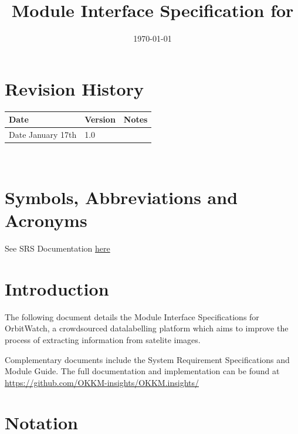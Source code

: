 \documentclass[12pt, titlepage]{article}
\begin{document}
\title{Module Interface Specification for \progname{}}

\author{\authname}

\date{\today}

\maketitle


\section{Revision History}

\begin{tabularx}{\textwidth}{p{3cm}p{2cm}X}
\toprule {\bf Date} & {\bf Version} & {\bf Notes}\\
\midrule
Date January 17th & 1.0 & \\
\bottomrule
\end{tabularx}

~\newpage

\section{Symbols, Abbreviations and Acronyms}

See SRS Documentation \href{https://github.com/OKKM-insights/OKKM.insights/tree/main/docs/SRS}{here}

\newpage

\tableofcontents

\newpage


\section{Introduction}

The following document details the Module Interface Specifications for
OrbitWatch, a crowdsourced datalabelling platform which aims to improve the process of extracting information from satelite images.

Complementary documents include the System Requirement Specifications
and Module Guide.  The full documentation and implementation can be
found at \url{https://github.com/OKKM-insights/OKKM.insights/}

\section{Notation}
\end{document}
